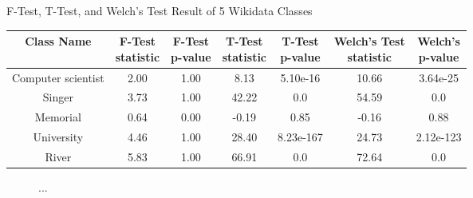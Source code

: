 \begin{center}
\small
\begin{threeparttable}
\caption{F-Test, T-Test, and Welch's Test Result of 5 Wikidata Classes}
\label{tab:western - mean test}
\begin{tabular}{c | c c c c c c} 
\toprule
    Class Name & \CellWithForceBreak{F-Test \\ statistic} & \CellWithForceBreak{F-Test \\ p-value} & \CellWithForceBreak{T-Test \\ statistic} & \CellWithForceBreak{T-Test \\ p-value} & \CellWithForceBreak{Welch's Test \\ statistic} & \CellWithForceBreak{Welch's \\ p-value} \\ [0.5ex] 
\midrule
    Computer scientist & 2.00 & 1.00 & 8.13 & 5.10e-16 & 10.66 & 3.64e-25 \\
    Singer & 3.73 & 1.00 & 42.22 & 0.0 & 54.59 & 0.0 \\
    Memorial & 0.64 & 0.00 & -0.19 & 0.85 & -0.16 & 0.88 \\
    University & 4.46 & 1.00 & 28.40 & 8.23e-167 & 24.73 & 2.12e-123 \\
    River & 5.83 & 1.00 & 66.91 & 0.0 & 72.64 & 0.0 \\
 [1ex]
\bottomrule
\end{tabular}
\begin{tablenotes}
    \footnotesize
\end{tablenotes}
\end{threeparttable}
\end{center}

\begin{figure}[htp]
\centering 
{}


\caption{...}
\label{fig:western - ratio of regional wealth to expectation}

\end{figure}